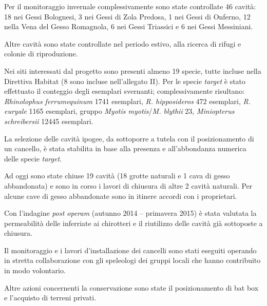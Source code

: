 {Per il monitoraggio invernale complessivamente sono state controllate 46 cavità: 18 nei Gessi Bolognesi, 3 nei Gessi di Zola Predosa, 1 nei Gessi di Onferno, 12 nella Vena del Gesso Romagnola, 6 nei Gessi Triassici e 6 nei Gessi Messiniani.

Altre cavità sono state controllate nel periodo estivo, alla ricerca di rifugi e colonie di riproduzione.

Nei siti interessati dal progetto sono presenti almeno 19 specie, tutte incluse nella Direttiva Habitat (8 sono incluse nell’allegato II).
Per le specie \textit{target} è stato effettuato il conteggio degli esemplari svernanti; complessivamente risultano: \emph{Rhinolophus ferrumequinum} 1741 esemplari, \emph{R. hipposideros} 472 esemplari, \emph{R. euryale} 1165 esemplari, gruppo \emph{Myotis myotis}/\emph{M. blythii} 23, \emph{Miniopterus schreibersii} 12445 esemplari.

La selezione delle cavità ipogee, da sottoporre a tutela con il posizionamento di un cancello, è stata stabilita in base alla presenza e all’abbondanza numerica delle specie \textit{target}.

Ad oggi sono state  chiuse 19 cavità (18 grotte naturali e 1 cava  di gesso abbandonata) e sono  in corso i lavori di chiusura di altre 2 cavità naturali. Per alcune cave di gesso abbandonate sono in itinere accordi con i proprietari.

Con l’indagine \textit{post operam} (autunno 2014 -- primavera 2015) è stata valutata la permeabilità delle inferriate ai chirotteri e il riutilizzo delle cavità già sottoposte a chiusura.

Il monitoraggio e i lavori d’installazione dei cancelli sono stati eseguiti operando in stretta collaborazione con gli speleologi dei gruppi locali che hanno contribuito in modo volontario.

Altre azioni concernenti la conservazione sono state il posizionamento di bat box e l’acquisto di terreni privati.
} %